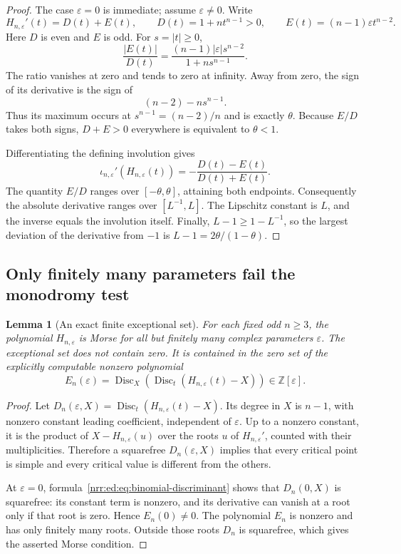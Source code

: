 \documentclass[11pt,letterpaper]{article}
\newtheorem{lemma}[theorem]{Lemma}
\theoremstyle{definition}
\theoremstyle{remark}
\newcommand{\Z}{\mathbb Z}
\newcommand{\Disc}{\operatorname{Disc}}
\newcommand{\eps}{\varepsilon}
\begin{document}
\begin{proof}
The case $\eps=0$ is immediate; assume $\eps\ne0$. Write
\[
 H_{n,\eps}'(t)=D(t)+E(t),\qquad
 D(t)=1+nt^{n-1}>0,\qquad E(t)=(n-1)\eps t^{n-2}.
\]
Here $D$ is even and $E$ is odd. For $s=|t|\ge0$,
\[
 \frac{|E(t)|}{D(t)}=
 \frac{(n-1)|\eps|s^{n-2}}{1+ns^{n-1}}.
\]
The ratio vanishes at zero and tends to zero at infinity. Away from zero, the
sign of its derivative is the sign of
\[
 (n-2)-ns^{n-1}.
\]
Thus its maximum occurs at $s^{n-1}=(n-2)/n$ and is exactly $\theta$. Because
$E/D$ takes both signs, $D+E>0$ everywhere is equivalent to $\theta<1$.

Differentiating the defining involution gives
\[
 \iota_{n,\eps}'(H_{n,\eps}(t))
 =-\frac{D(t)-E(t)}{D(t)+E(t)}.
\]
The quantity $E/D$ ranges over $[-\theta,\theta]$, attaining both endpoints.
Consequently the absolute derivative ranges over $[L^{-1},L]$. The Lipschitz
constant is $L$, and the inverse equals the involution itself. Finally,
$L-1\ge1-L^{-1}$, so the largest deviation of the derivative from $-1$ is
$L-1=2\theta/(1-\theta)$.
\end{proof}

\subsection{Only finitely many parameters fail the monodromy test}

\begin{lemma}[An exact finite exceptional set]
\label{nrr:ed:lem:exceptional}
For each fixed odd $n\ge3$, the polynomial $H_{n,\eps}$ is Morse for all but
finitely many complex parameters $\eps$. The exceptional set does not contain
zero. It is contained in the zero set of the explicitly computable nonzero
polynomial
\begin{equation}
 E_n(\eps)=\Disc_X\!\left(\Disc_t(H_{n,\eps}(t)-X)\right)\in\Z[\eps].
 \label{nrr:ed:eq:exceptional-polynomial}
\end{equation}
\end{lemma}

\begin{proof}
Let $D_n(\eps,X)=\Disc_t(H_{n,\eps}(t)-X)$. Its degree in $X$ is $n-1$, with
nonzero constant leading coefficient, independent of $\eps$. Up to a nonzero
constant, it is the product of $X-H_{n,\eps}(u)$ over the roots $u$ of
$H_{n,\eps}'$, counted with their multiplicities. Therefore a squarefree
$D_n(\eps,X)$ implies that every critical point is simple and every critical
value is different from the others.

At $\eps=0$, formula~\eqref{nrr:ed:eq:binomial-discriminant} shows that $D_n(0,X)$ is
squarefree: its constant term is nonzero, and its derivative can vanish at a
root only if that root is zero. Hence $E_n(0)\ne0$. The polynomial $E_n$ is
nonzero and has only finitely many roots. Outside those roots $D_n$ is squarefree,
which gives the asserted Morse condition.
\end{proof}
\end{document}
